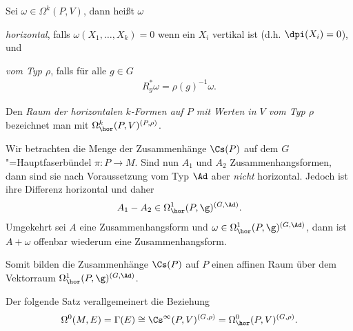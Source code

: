 \documentclass[%
	paper=a5,%
	fleqn,%
	DIV=18,%
	BCOR=0mm,
	fontsize=11pt,
	titlepage=false,%
	bibliography=totoc,
	DIV=18,%
	twoside=true,
	pdftitle=Riemannsche Geometrie,
	pdfauthor=Uwe Semmelmann,
	numbers=noendperiod]%
	{scrbook}
\begin{document}
\begin{defn}
Sei $\omega\in \Omega^k(P,V)$, dann heißt $\omega$
\begin{defnenum}
\item \emph{horizontal}, falls $\omega(X_1,\ldots,X_k) = 0$ wenn ein $X_i$
vertikal ist (d.h. $\dpi(X_i) = 0$), und
\item \emph{vom Typ $\rho$}, falls für alle $g\in G$
\begin{align*}
R_g^* \omega = \rho(g)^{-1}\omega.
\end{align*}
\end{defnenum}
Den \emph{Raum der horizontalen $k$-Formen auf $P$ mit Werten in $V$ vom Typ
$\rho$} bezeichnet man mit $\Omega^k_\hor(P,V)^{(P,\rho)}$.\fish
\end{defn}

\begin{ex}
Wir betrachten die Menge der Zusammenhänge $\Cs(P)$ auf dem
$G$"=Hauptfaserbündel $\pi: P\to M$. Sind nun $A_1$ und $A_2$
Zusammenhangsformen, dann sind sie nach Voraussetzung vom Typ $\Ad$ aber
\textit{nicht} horizontal. Jedoch ist ihre Differenz horizontal und daher
\begin{align*}
A_1-A_2 \in \Omega^1_\hor(P,\g)^{(G,\Ad)}.
\end{align*}
Umgekehrt sei $A$ eine Zusammenhangsform und
$\omega\in\Omega_\hor^1(P,\g)^{(G,\Ad)}$, dann ist $A+\omega$ offenbar wiederum
eine Zusammenhangsform.

Somit bilden die Zusammenhänge $\Cs(P)$ auf $P$ einen affinen Raum über dem
Vektorraum $\Omega_\hor^1(P,\g)^{(G,\Ad)}$.\boxc
\end{ex}

Der folgende Satz verallgemeinert die Beziehung
\begin{align*}
\Omega^0(M,E) = \Gamma(E)\cong \Cs^\infty(P,V)^{(G,\rho)} = \Omega_\hor^0(P,V)^{(G,\rho)}.
\end{align*}
\end{document}
